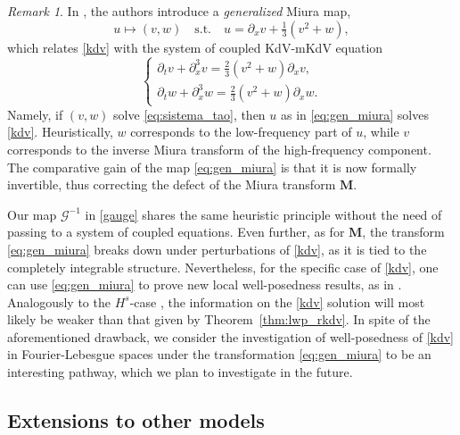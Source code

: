 \documentclass[a4paper,
11pt,  reqno]{amsart}
\newcommand{\5}{\textup{V}}
\newcommand{\noi}{\noindent}
\newcommand{\dx}{\partial_x}
\newcommand{\dt}{\partial_t}
\theoremstyle{remark}
\newtheorem{remark}[theorem]{Remark}
\newcommand{\MMb}{\mathbf{M}}
\newcommand{\Gc}{\mathcal{G}}
\numberwithin{equation}{section}
\numberwithin{theorem}{section}
\begin{document}
\begin{remark}
In \cite{CCT_ill}, the authors introduce a \emph{generalized} Miura map,
\begin{equation}\label{eq:gen_miura}
u\mapsto (v,w)\quad \mbox{s.t.}\quad u=\dx v + \tfrac13(v^2 + w),
\end{equation}
which relates \eqref{kdv} with the system of coupled KdV-mKdV equation
\begin{equation}\label{eq:sistema_tao}
\begin{cases}
\dt v + \dx^3 v = \tfrac23 (v^2 + w)\dx v,
\\
\dt w + \dx^3 w = \tfrac23 (v^2 + w)\dx w
.
\end{cases}
\end{equation}
Namely, if $(v,w)$ solve \eqref{eq:sistema_tao}, then $u$ as in \eqref{eq:gen_miura} solves \eqref{kdv}.
Heuristically, $w$ corresponds to the low-frequency part of $u$, while $v$ corresponds to the inverse Miura transform of the high-frequency component.
The comparative gain of the map \eqref{eq:gen_miura} is that it is now formally invertible, thus correcting the defect of the Miura transform $\MMb$.

\noi
Our map $\Gc^{-1}$ in \eqref{gauge} shares the same heuristic principle without the need of passing to a system of coupled equations. Even further, as for $\MMb$, the transform \eqref{eq:gen_miura} breaks down under perturbations of \eqref{kdv}, as it is tied to the completely integrable structure.
Nevertheless, for the specific case of \eqref{kdv}, one can use \eqref{eq:gen_miura} to prove new local well-posedness results, as in \cite{CCT_ill}. Analogously to the $H^s$-case \cite{Guo_gwp, Kishimoto_lwp_crit}, the information on the \eqref{kdv} solution will most likely be weaker than that given by Theorem~\ref{thm:lwp_rkdv}.
In spite of the aforementioned drawback, we consider the investigation of well-posedness of \eqref{kdv} in Fourier-Lebesgue spaces under the transformation \eqref{eq:gen_miura} to be an interesting pathway, which we plan to investigate in the future.



\end{remark}





\subsection{Extensions to other models}
\label{sec:dgbo}
\end{document}
